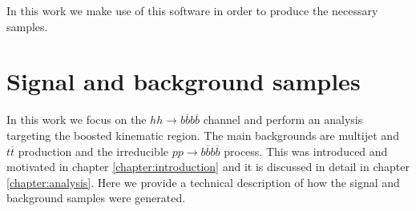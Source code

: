 In this work we make use of this software in order to produce the necessary samples.

%

\section{Signal and background samples}
\label{sec:sig+bkg}

In this work we focus on the $hh\rightarrow b\overline{b}b\overline{b}$ channel and perform an analysis targeting the boosted kinematic region. The main backgrounds are multijet and $t\overline{t}$ production and the irreducible $pp\rightarrow b\overline{b}b\overline{b}$ process. This was introduced and motivated in chapter \ref{chapter:introduction} and it is discussed in detail in chapter \ref{chapter:analysis}. Here we provide a technical description of how the signal and background samples were generated. 


